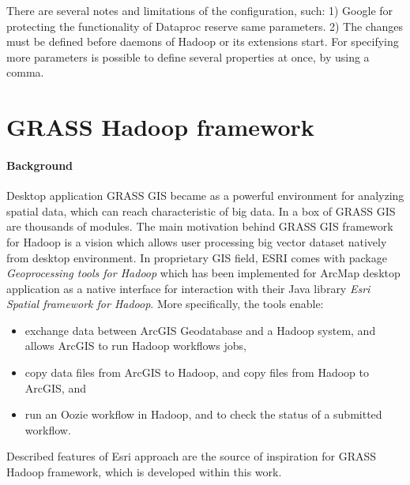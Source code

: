 \documentclass[a4paper,12pt,oneside]{report}
\begin{document}
    There are several notes and limitations  of the configuration, such: 1)
    Google for protecting the functionality of Dataproc reserve same parameters. 2) The
    changes must be defined before daemons of Hadoop or its extensions start.  For
    specifying more parameters is possible to define several properties at once, by
    using a comma.
    
    
    \section{GRASS Hadoop framework}
    \paragraph{Background}
    Desktop application GRASS GIS became as a powerful environment for analyzing
    spatial data, which can  reach characteristic of big data. In a box of GRASS GIS are 
    thousands of modules. The main motivation behind GRASS GIS framework for Hadoop is 
    a vision which allows user
    processing big vector dataset natively from desktop environment. In proprietary GIS field,
    ESRI comes with package \textit{Geoprocessing tools for Hadoop}\cite{esri_gtfp} 
    which has been implemented for ArcMap desktop application  as a native interface
    for interaction with  their Java library \textit{Esri Spatial framework for Hadoop}. More
    specifically, the tools enable:
	
	\begin{itemize}
		\item exchange data between ArcGIS Geodatabase and a Hadoop system, and allows
		ArcGIS to run Hadoop workflows jobs,
		\item copy data files from ArcGIS to Hadoop, and copy files from Hadoop to
		ArcGIS, and 
		\item run an Oozie workflow in Hadoop, and to check the status of a submitted
		workflow.
	\end{itemize}
	
    Described features of Esri approach are the source of inspiration for GRASS Hadoop framework, 
    which is developed within this work.
    
\end{document}
